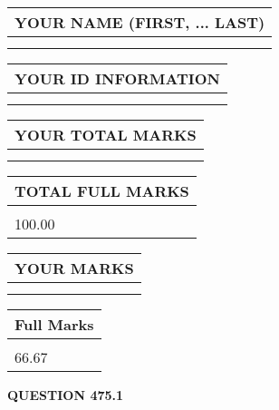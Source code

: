 \documentclass{ctexart}
\begin{document}
   
   
   
\newpage 
\setcounter{page}{ 
   475001 } 
   
   
   
   
\noindent\begin{tabular}{|l|}
\hline
YOUR NAME (FIRST, ... LAST)  \\
\hline
 \\ 
 \\ 
\hline
\end{tabular}
\hspace{0.05in} \begin{tabular}{|l|}
\hline
 YOUR   ID   INFORMATION  \\
\hline
 \\ 
 \\ 
\hline
\end{tabular}
   
   
\vspace{0.2in}\noindent\begin{tabular}{|l|}
\hline
YOUR TOTAL MARKS  \\
\hline
 \\ 
 \\ 
\hline
\end{tabular}
\hspace{0.05in} \begin{tabular}{|l|}
\hline
TOTAL FULL MARKS  \\
\hline
 \\ 
100.00 \\
\hline
\end{tabular}
   
   
 \vspace{0.2in}
 
 
 
 
   
   
  
\vspace{0.2in}
  
\noindent\begin{tabular}{|l|}
\hline
 YOUR MARKS  \\
\hline
 \\ 
 \\ 
\hline
\end{tabular}
\hspace{0.05in} \begin{tabular}{|l|}
\hline
 Full Marks  \\
\hline
 \\ 
66.67 \\
\hline
\end{tabular}
{\textbf{\Large{QUESTION
475.1 
}}}
  
\end{document}
